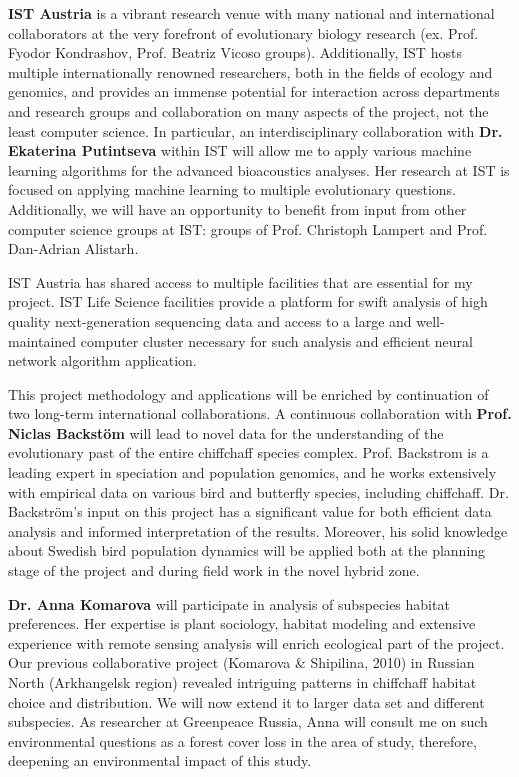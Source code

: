 \documentclass[11pt,a4paper]{article}
\begin{document}
{\bf IST Austria} is a vibrant research venue with many national and international collaborators at the very forefront of evolutionary biology research (ex. Prof. Fyodor Kondrashov, Prof. Beatriz Vicoso groups). Additionally, IST hosts multiple internationally renowned researchers, both in the fields of ecology and genomics, and provides an immense potential for interaction across departments and research groups and collaboration on many aspects of the project, not the least computer science. In particular, an interdisciplinary collaboration with {\bf Dr. Ekaterina Putintseva} within IST will allow me to apply various machine learning algorithms for the advanced bioacoustics analyses. Her research at IST is focused on applying machine learning to multiple evolutionary questions. Additionally, we will have an opportunity to benefit from input from other computer science groups at IST: groups of Prof. Christoph Lampert and Prof. Dan-Adrian Alistarh.  

IST Austria has shared access to multiple facilities that are essential for my project. IST Life Science facilities provide a platform for swift analysis of high quality next-generation sequencing data and access to a large and well-maintained computer cluster necessary for such analysis and efficient neural network algorithm application. 

This project methodology and applications will be enriched by continuation of two long-term international collaborations. A continuous collaboration with {\bf Prof. Niclas Backstöm} will lead to novel data for the understanding of the evolutionary past of the entire chiffchaff species complex. Prof. Backstrom is a leading expert in speciation and population genomics, and he works extensively with empirical data on various bird and butterfly species, including chiffchaff. Dr. Backström's input on this project has a significant value for both efficient data analysis and informed interpretation of the results. Moreover, his solid knowledge about Swedish bird population dynamics will be applied both at the planning stage of the project and during field work in the novel hybrid zone.

{\bf Dr. Anna Komarova} will participate in analysis of subspecies habitat preferences. Her expertise is plant sociology, habitat modeling and extensive experience with remote sensing analysis will enrich ecological part of the project. Our previous collaborative project (Komarova \& Shipilina, 2010) in Russian North (Arkhangelsk region) revealed intriguing patterns in chiffchaff habitat choice and distribution. We will now extend it to larger data set and different subspecies. As researcher at Greenpeace Russia, Anna will consult me on such environmental questions as a forest cover loss in the area of study, therefore, deepening an environmental impact of this study. 
\end{document}
